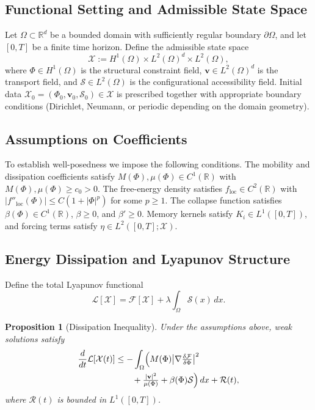 \documentclass[11pt, a4paper, twocolumn]{article}
\newtheorem{proposition}[definition]{Proposition}
\newcommand{\X}{\mathcal{X}}
\newcommand{\Sfield}{\mathcal{S}}
\newcommand{\F}{\mathcal{F}}
\begin{document}
\subsection{Functional Setting and Admissible State Space}

Let $\Omega \subset \mathbb{R}^d$ be a bounded domain with sufficiently regular
boundary $\partial\Omega$, and let $[0,T]$ be a finite time horizon. Define the
admissible state space
\[
    \mathcal{X} := H^1(\Omega) \times L^2(\Omega)^d \times L^2(\Omega),
\]
where $\Phi \in H^1(\Omega)$ is the structural constraint field, $\mathbf{v}
\in L^2(\Omega)^d$ is the transport field, and $\Sfield \in L^2(\Omega)$ is the
configurational accessibility field. Initial data $\X_0 = (\Phi_0,\mathbf{v}_0,
\Sfield_0) \in \mathcal{X}$ is prescribed together with appropriate boundary
conditions (Dirichlet, Neumann, or periodic depending on the domain geometry).

\subsection{Assumptions on Coefficients}

To establish well-posedness we impose the following conditions. The mobility
and dissipation coefficients satisfy $M(\Phi),\mu(\Phi) \in C^1(\mathbb{R})$
with $M(\Phi),\mu(\Phi) \geq c_0 > 0$. The free-energy density satisfies
$f_{\mathrm{loc}} \in C^2(\mathbb{R})$ with $|f''_{\mathrm{loc}}(\Phi)| \leq
C(1+|\Phi|^p)$ for some $p \geq 1$. The collapse function satisfies
$\beta(\Phi) \in C^1(\mathbb{R})$, $\beta \geq 0$, and $\beta' \geq 0$. Memory
kernels satisfy $K_i \in L^1([0,T])$, and forcing terms satisfy $\eta \in
L^2([0,T];\mathcal{X})$.

\subsection{Energy Dissipation and Lyapunov Structure}

Define the total Lyapunov functional
\[
    \mathcal{L}[\X] = \F[\X] + \lambda\int_\Omega \Sfield(x)\,dx.
\]

\begin{proposition}[Dissipation Inequality]
Under the assumptions above, weak solutions satisfy
\begin{align*}
    \frac{d}{dt}\mathcal{L}[\X(t)]
    &\leq
    -\int_\Omega \Bigl(
        M(\Phi)\bigl|\nabla\tfrac{\delta\F}{\delta\Phi}\bigr|^2\\
    &\qquad
        + \tfrac{|\mathbf{v}|^2}{\mu(\Phi)}
        + \beta(\Phi)\Sfield
    \Bigr)\,dx
    + \mathcal{R}(t),
\end{align*}
where $\mathcal{R}(t)$ is bounded in $L^1([0,T])$.
\end{proposition}
\end{document}
